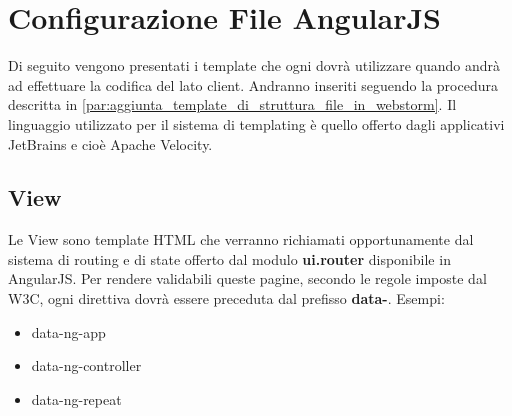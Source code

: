 %



\section{Configurazione File AngularJS} %
\label{sec:configurazione_file_angularjs}
Di seguito vengono presentati i template che ogni \roleProgrammer{} dovrà utilizzare quando andrà ad effettuare la codifica del lato client. Andranno inseriti seguendo la procedura descritta in \ref{par:aggiunta_template_di_struttura_file_in_webstorm}. Il linguaggio utilizzato per il sistema di templating è quello offerto dagli applicativi JetBrains e cioè Apache Velocity. \newline

	\subsection{View} %
	\label{sub:view}
	Le View sono template HTML che verranno richiamati opportunamente dal sistema di routing e di state offerto dal modulo \textbf{ui.router} disponibile in AngularJS. \newline
	Per rendere validabili queste pagine, secondo le regole imposte dal W3C, ogni direttiva dovrà essere preceduta dal prefisso \textbf{data-}. \newline
	Esempi:
		\begin{itemize}
			\item data-ng-app
			\item data-ng-controller
			\item data-ng-repeat
		\end{itemize}


